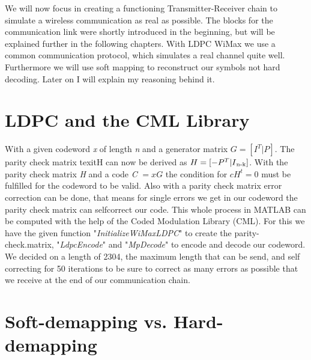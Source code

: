 \documentclass[12pt,oneside, reqno]{report}
\begin{document}
We will now focus in creating a functioning Transmitter-Receiver chain to simulate a wireless communication as real as possible. The blocks for the communication link were shortly introduced in the beginning, but will be explained further in the following chapters. With LDPC WiMax we use a common communication protocol, which simulates a real channel quite well. Furthermore we will use soft mapping to reconstruct our symbols not hard decoding. Later on I will explain my reasoning behind it.  

\section{LDPC and the CML Library}
With a given codeword \textit{x} of length \textit{n} and a generator matrix $G = [I^T|P]$. The parity check matrix texit{H} can now be derived as $H = [-P^T|I\textsubscript{n-k}]$. With the parity check matrix \textit{H} and a code \textit{C} $= xG$ the condition for $cH^t = 0$ must be fulfilled for the codeword to be valid.  
Also with a parity check matrix error correction can be done, that means for single errors we get in our codeword the parity check matrix can selfcorrect our code.
This whole process in MATLAB can be computed with the help of the Coded Modulation Library (CML). For this we have the given function "\textit{InitializeWiMaxLDPC}" to create the parity-check.matrix, "\textit{LdpcEncode}" and "\textit{MpDecode}" to encode and decode our codeword.
We decided on a length of 2304, the maximum length that can be send, and self correcting for 50 iterations to be sure to correct as many errors as possible that we receive at the end of our communication chain.

\section{Soft-demapping vs. Hard-demapping}
\end{document}
